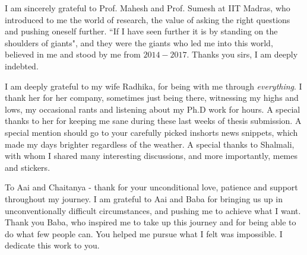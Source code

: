 I am sincerely grateful to Prof. Mahesh and Prof. Sumesh at IIT Madras, who introduced to me the world of research, the value of asking the right questions and pushing oneself further.
``If I have seen further it is by standing on the shoulders of giants", and they were the giants who led me into this world, believed in me and stood by me from $2014-2017$.
Thanks you sirs, I am deeply indebted.

I am deeply grateful to my wife Radhika, for being with me through \textit{everything}.
I thank her for her company, sometimes just being there, witnessing my highs and lows, my occasional rants and listening about my Ph.D work for hours.
A special thanks to her for keeping me sane during these last weeks of thesis submission. 
A special mention should go to your carefully picked inshorts news snippets, which made my days brighter regardless of the weather. 
A special thanks to Shalmali, with whom I shared many interesting discussions, and more importantly, memes and stickers. 

To Aai and Chaitanya - thank for your unconditional love, patience and support throughout my journey.
I am grateful to Aai and Baba for bringing us up in unconventionally difficult circumstances, and pushing me to achieve what I want. 
Thank you Baba, who inspired me to take up this journey and for being able to do what few people can. 
You helped me pursue what I felt was impossible.
I dedicate this work to you.